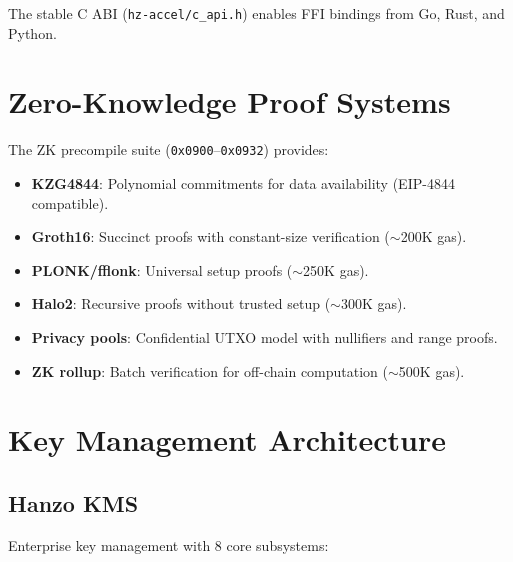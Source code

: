 \documentclass[11pt,letterpaper]{article}
\begin{document}
The stable C ABI (\texttt{hz-accel/c\_api.h}) enables FFI bindings from Go, Rust, and Python.

\section{Zero-Knowledge Proof Systems}

The ZK precompile suite (\texttt{0x0900}--\texttt{0x0932}) provides:

\begin{itemize}
\item \textbf{KZG4844}: Polynomial commitments for data availability (EIP-4844 compatible).
\item \textbf{Groth16}: Succinct proofs with constant-size verification ($\sim$200K gas).
\item \textbf{PLONK/fflonk}: Universal setup proofs ($\sim$250K gas).
\item \textbf{Halo2}: Recursive proofs without trusted setup ($\sim$300K gas).
\item \textbf{Privacy pools}: Confidential UTXO model with nullifiers and range proofs.
\item \textbf{ZK rollup}: Batch verification for off-chain computation ($\sim$500K gas).
\end{itemize}

\section{Key Management Architecture}

\subsection{Hanzo KMS}

Enterprise key management with 8 core subsystems:
\end{document}
